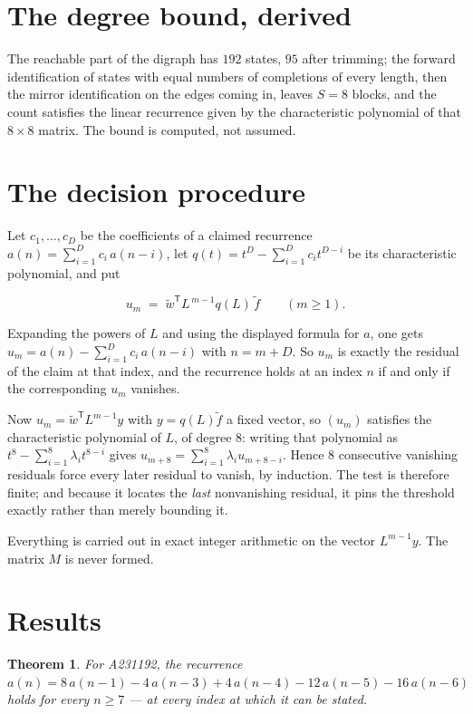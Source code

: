 \documentclass[11pt]{article}
\newtheorem{theorem}{Theorem}
\theoremstyle{definition}
\begin{document}
\section{The degree bound, derived}

The reachable part of the digraph has $192$ states, $95$ after trimming; the forward identification of states with equal numbers of completions of every length, then the mirror identification on the edges coming in, leaves $S = 8$ blocks, and the count satisfies the linear recurrence given by the characteristic polynomial of that $8\times8$ matrix. The bound is computed, not assumed.

\section{The decision procedure}

Let $c_1,\dots,c_D$ be the coefficients of a claimed recurrence $a(n) = \sum_{i=1}^{D} c_i\,a(n-i)$, let $q(t) = t^{D} - \sum_{i=1}^{D} c_i t^{D-i}$ be its characteristic polynomial, and put

\[u_m \;=\; \tilde w^{\mathsf T} L^{\,m-1} q(L)\,\tilde f \qquad (m \ge 1).\]

Expanding the powers of $L$ and using the displayed formula for $a$, one gets $u_m = a(n) - \sum_{i=1}^{D} c_i\,a(n-i)$ with $n = m + D$. So $u_m$ is exactly the residual of the claim at that index, and the recurrence holds at an index $n$ if and only if the corresponding $u_m$ vanishes.

Now $u_m = \tilde w^{\mathsf T} L^{m-1} y$ with $y = q(L)\tilde f$ a fixed vector, so $(u_m)$ satisfies the characteristic polynomial of $L$, of degree $8$: writing that polynomial as $t^{8} - \sum_{i=1}^{8} \lambda_i t^{8-i}$ gives $u_{m+8} = \sum_{i=1}^{8} \lambda_i u_{m+8-i}$. Hence $8$ consecutive vanishing residuals force every later residual to vanish, by induction. The test is therefore finite; and because it locates the {\itshape last} nonvanishing residual, it pins the threshold exactly rather than merely bounding it.

Everything is carried out in exact integer arithmetic on the vector $L^{m-1}y$. The matrix $M$ is never formed.

\section{Results}

\begin{theorem} For A231192, the recurrence $a(n) = 8\,a(n-1) - 4\,a(n-3) + 4\,a(n-4) - 12\,a(n-5) - 16\,a(n-6)$ holds for every $n \ge 7$ --- at every index at which it can be stated.\end{theorem}
\end{document}
